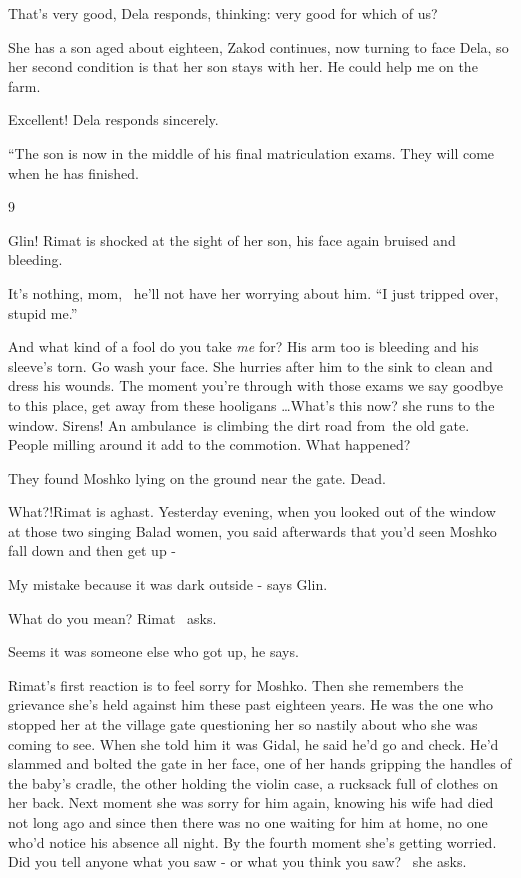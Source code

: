 \documentclass[12pt]{book}
\begin{document}
{\textquotedbl}That's very good,{\textquotedbl} Dela responds, thinking: very good for which of us?

{\textquotedbl}She has a son aged about eighteen,{\textquotedbl} Zakod continues, now turning to face Dela,
{\textquotedbl}so her second condition is that her son stays with her. He could help me on the farm.{\textquotedbl}

{\textquotedbl}Excellent!{\textquotedbl} Dela responds sincerely.

{}``The son is now in the middle of his final matriculation exams. They will come when he has finished.{\textquotedbl}


\bigskip

9

{\textquotedbl}Glin!{\textquotedbl} Rimat is shocked at the sight of her son, his face again bruised and bleeding.

{\textquotedbl}It's nothing, mom,{\textquotedbl} \ he'll not have her worrying about him. ``I just tripped over, stupid
me.''

{\textquotedbl}And what kind of a fool do you take \textit{me} for?{\textquotedbl} His arm too is bleeding and his
sleeve's torn. {\textquotedbl}Go wash your face.{\textquotedbl} She hurries after him to the sink to clean and dress
his wounds. {\textquotedbl}The moment you're through with those exams we say goodbye to this place, get away from these
hooligans {\dots}What's this now?{\textquotedbl} she runs to the window. Sirens! An ambulance~is climbing the dirt road
from~the old gate. People milling around it add to the commotion. {\textquotedbl}What happened?{\textquotedbl}

{\textquotedbl}They found Moshko lying on the ground near the gate. Dead.{\textquotedbl}

{\textquotedbl}What?!{\textquotedbl}Rimat is aghast{. }{\textquotedbl}Yesterday evening, when you looked
out of the window at those two singing Balad women, you said afterwards that you'd seen Moshko fall down and then get
up -{\textquotedbl}

{\textquotedbl}My mistake because it was dark outside -{\textquotedbl} says Glin.

{\textquotedbl}What do you mean?{\textquotedbl} Rimat \ asks.

{\textquotedbl}Seems it was someone else who got up,{\textquotedbl} he says.

Rimat's first reaction is to feel sorry for Moshko. Then she remembers the grievance she's held against him these
past{ }eighteen years. He was the one who stopped her at the village gate questioning her so nastily
about who she was coming to see. When she told him it was Gidal, he said he'd go and check. He'd slammed and bolted the
gate in her face, one of her hands gripping the handles of the baby's cradle, the other holding the violin case, a
rucksack full of clothes on her back. Next moment she was sorry for him again, knowing his wife had died not long ago
and since then there was no one waiting for him at home, no one who'd notice his absence all night. By the fourth
moment she's getting worried. {\textquotedbl}Did you tell anyone what you saw - or what you think you
saw?{\textquotedbl} \ she asks.
\end{document}

